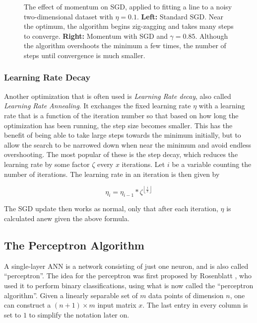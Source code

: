 	\begin {figure}[!ht]
		\begin{center}
			\scalebox{0.75}{}
		\end{center}
		\caption[]{The effect of momentum on SGD, applied to fitting a line to a noisy two-dimensional dataset with $\eta = 0.1$. \textbf{Left:} Standard SGD. Near the optimum, the algorithm begins zig-zagging and takes many steps to converge. \textbf{Right:} Momentum with SGD and $\gamma = 0.85$. Although the algorithm overshoots the minimum a few times, the number of steps until convergence is much smaller.}
		\label{fig:momentum}
	\end {figure}


	\subsubsection {Learning Rate Decay}
Another optimization that is often used is \textit{Learning Rate decay}, also called \textit{Learning Rate Annealing}. It exchanges the fixed learning rate $\eta$ with a learning rate that is a function of the iteration number so that based on how long the optimization has been running, the step size becomes smaller. This has the benefit of being able to take large steps towards the minimum initially, but to allow the search to be narrowed down when near the minimum and avoid endless overshooting. The most popular of these is the step decay, which reduces the learning rate by some factor $\zeta$ every $x$ iterations. Let $i$ be a variable counting the number of iterations. The learning rate in an iteration is then given by

\[ \eta_i = \eta_{i-1} * {\zeta}^{\left \lfloor \frac{i}{x} \right \rfloor} \]

\noindent The SGD update then works as normal, only that after each iteration, $\eta$ is calculated anew given the above formula.




	\subsection{The Perceptron Algorithm}
\label{subsec:perceptron_algo}

A single-layer ANN is a network consisting of just one neuron, and is also called ``perceptron''. The idea for the perceptron was first proposed by Rosenblatt \cite{rosenblatt_report, rosenblatt_book}, who used it to perform binary classifications, using what is now called the ``perceptron algorithm''. Given a linearly separable set of $m$ data points of dimension $n$, one can construct a $(n+1) \times m$ input matrix $x$. The last entry in every column is set to $1$ to simplify the notation later on.

